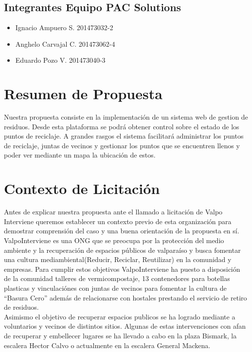 \documentclass[paper=letter, fontsize=11pt]{scrartcl} %
\numberwithin{equation}{section} %
\numberwithin{figure}{section} %
\numberwithin{table}{section} %
\begin{document}
\subsection*{Integrantes Equipo PAC Solutions}
\begin {itemize}
\item Ignacio Ampuero S. 201473032-2
\item Anghelo Carvajal C. 201473062-4 
\item Eduardo Pozo V. 201473040-3
\end{itemize} 
\section{Resumen de Propuesta}
Nuestra propuesta consiste en la implementación de un sistema web de gestion de residuos. Desde esta plataforma se podrá obtener control sobre el estado de los puntos de reciclaje. A grandes rasgos el sistema facilitará administrar los puntos de reciclaje, juntas de vecinos y gestionar los puntos que se encuentren llenos y poder ver mediante un mapa la ubicación de estos.

\section{Contexto de Licitación}
Antes de explicar nuestra propuesta ante el llamado a licitación de Valpo Interviene queremos establecer un contexto previo de esta organización para demostrar comprensión del caso y una buena orientación de la propuesta en sí.\\

ValpoInterviene es una ONG que se preocupa por la protección del medio ambiente y la recuperación de espacios públicos de valparaíso y busca fomentar una cultura mediambiental(Reducir, Reciclar, Reutilizar) en la comunidad y empresas. Para cumplir estos objetivos ValpoInterviene ha puesto a disposición de la comunidad talleres de vermicompostaje, 13 contenedores para botellas plasticas y vinculaciónes con juntas de vecinos para fomentar la cultura de “Basura Cero” además de relacionarse con hostales prestando el servicio de retiro de residuos.\\

Asimismo el objetivo de recuperar espacios publicos se ha logrado mediante a voluntarios y vecinos de distintos sitios. Algunas de estas intervenciones con afan de recuperar y embellecer lugares se ha llevado a cabo en la plaza Bismark, la escalera Hector Calvo o actualmente en la escalera General Mackena.\\
\end{document}
